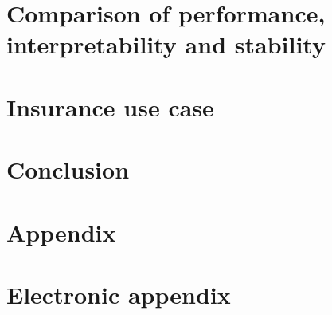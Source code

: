 \documentclass[12pt]{article}
\begin{document}
\section{Comparison of performance, interpretability and stability}
\label{simulation}

\newpage
\clearpage

\section{Insurance use case}
\label{usecase}

\newpage

\clearpage


\section{Conclusion}
\label{conclusion}


\newpage





\newpage
  



\newpage
\newpage
\listoffigures
\newpage
\listoftables
\newpage

\appendix

\section{Appendix}
\label{app}

\newpage
\clearpage

\section{Electronic appendix}
\label{el_app}
\end{document}
